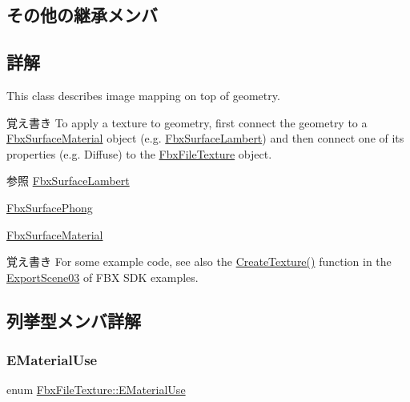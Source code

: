 \subsection*{その他の継承メンバ}


\subsection{詳解}
This class describes image mapping on top of geometry. \begin{DoxyNote}{覚え書き}
To apply a texture to geometry, first connect the geometry to a \hyperlink{class_fbx_surface_material}{Fbx\+Surface\+Material} object (e.\+g. \hyperlink{class_fbx_surface_lambert}{Fbx\+Surface\+Lambert}) and then connect one of its properties (e.\+g. Diffuse) to the \hyperlink{class_fbx_file_texture}{Fbx\+File\+Texture} object. 
\end{DoxyNote}
\begin{DoxySeeAlso}{参照}
\hyperlink{class_fbx_surface_lambert}{Fbx\+Surface\+Lambert} 

\hyperlink{class_fbx_surface_phong}{Fbx\+Surface\+Phong} 

\hyperlink{class_fbx_surface_material}{Fbx\+Surface\+Material} 
\end{DoxySeeAlso}
\begin{DoxyNote}{覚え書き}
For some example code, see also the \hyperlink{namespace_export_scene03_a31fdba5cdc721d7ab9f9e8ed00c60a1a}{Create\+Texture()} function in the \hyperlink{namespace_export_scene03}{Export\+Scene03} of F\+BX S\+DK examples. 
\end{DoxyNote}


\subsection{列挙型メンバ詳解}
\mbox{\label{class_fbx_file_texture_ae85eb429015d450d8cb8a753634c0d1e}} 
\subsubsection{\texorpdfstring{E\+Material\+Use}{EMaterialUse}}
{\footnotesize\ttfamily enum \hyperlink{class_fbx_file_texture_ae85eb429015d450d8cb8a753634c0d1e}{Fbx\+File\+Texture\+::\+E\+Material\+Use}}

